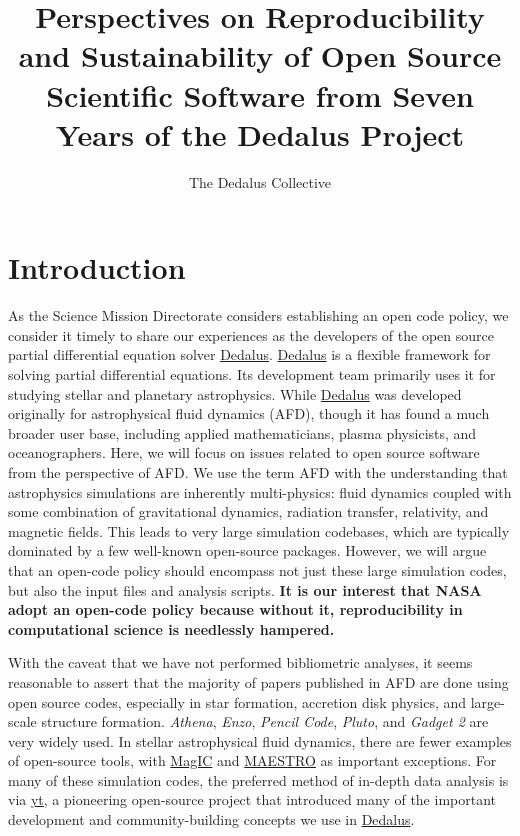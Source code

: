 \documentclass[12pt, preprint]{aastex}
\title{Perspectives on Reproducibility and Sustainability of Open Source Scientific Software from Seven Years of the Dedalus Project}
\author{The Dedalus Collective}
\newcommand{\dedalus}{\href{http://dedalus-project.org}{Dedalus}}
\begin{document}
\maketitle

\section{Introduction}
\label{sec:intro}
As the Science Mission Directorate considers establishing an open code policy, we consider it timely to share our experiences as the developers of the open source partial differential equation solver \dedalus{}. \dedalus{} is a flexible framework for solving partial differential equations. Its development team primarily uses it for studying stellar and planetary astrophysics. While \dedalus{} was developed originally for astrophysical fluid dynamics (AFD), though it has found a much broader user base, including applied mathematicians, plasma physicists, and oceanographers. Here, we will focus on issues related to open source software from the perspective of AFD. We use the term AFD with the understanding that astrophysics simulations are inherently multi-physics: fluid dynamics coupled with some combination of gravitational dynamics, radiation transfer, relativity, and magnetic fields. This leads to very large simulation codebases, which are typically dominated by a few well-known open-source packages. However, we will argue that an open-code policy should encompass not just these large simulation codes, but also the input files and analysis scripts. \textbf{It is our interest that NASA adopt an open-code policy because without it, reproducibility in computational science is needlessly hampered.} 

With the caveat that we have not performed bibliometric analyses, it seems reasonable to assert that the majority of papers published in AFD are done using open source codes, especially in star formation, accretion disk physics, and large-scale structure formation. \emph{Athena}, \emph{Enzo}, \emph{Pencil Code}, \emph{Pluto}, and \emph{Gadget 2} are very widely used. In stellar astrophysical fluid dynamics, there are fewer examples of open-source tools, with \href{http://magic-sph.github.io}{MagIC} and \href{http://amrex-astro.github.io/MAESTRO/}{MAESTRO} as important exceptions. For many of these simulation codes, the preferred method of in-depth data analysis is via \href{http://yt-project.org}{yt}, a pioneering open-source project that introduced many of the important development and community-building concepts we use in \dedalus{}. 
\end{document}
